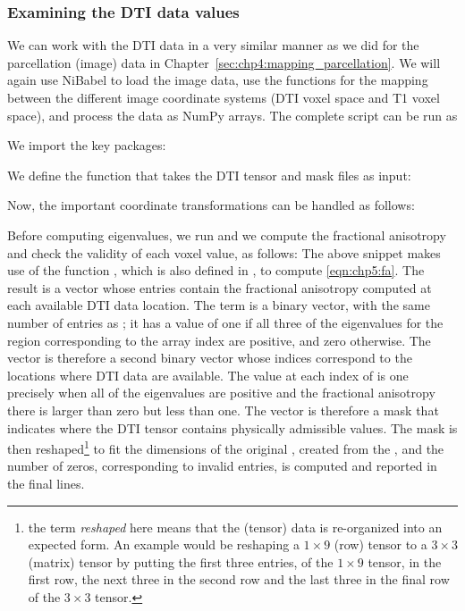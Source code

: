 \subsubsection*{Examining the DTI data values}
We can work with the DTI data in a very similar manner as we did
for the parcellation (image) data in
Chapter~\ref{sec:chp4:mapping_parcellation}. We will again use NiBabel
to load the image data, use the  functions for the mapping
between the different image coordinate systems (DTI voxel space and T1
voxel space), and process the data as NumPy arrays. The complete
script can be run as

We import the key packages:

\noindent We define the function  that takes the DTI
tensor and mask files as input: 

\noindent Now, the important coordinate transformations can be handled as follows:

\noindent Before computing eigenvalues, we run
and we compute the fractional anisotropy and check the validity of each voxel value, as follows:
The above snippet makes use of the function , which is also 
defined in , to compute \eqref{eqn:chp5:fa}.  The result is 
a vector  whose entries contain the fractional anisotropy computed at 
each available DTI data location. The term  is a binary vector, with the 
same number of entries as ; it has a value of one if all three of the eigenvalues 
for the region corresponding to the array index are positive, and zero otherwise. 
The vector  is therefore a second binary vector whose indices correspond 
to the locations where DTI data are available.  The value at each index of  
is one precisely when all of the eigenvalues are positive and the fractional anisotropy 
there is larger than zero but less than one.  The  vector is therefore 
a mask that indicates where the DTI tensor contains physically admissible values.
The  mask is then reshaped\footnote{the term \textit{reshaped} here 
means that the (tensor) data is re-organized into an expected form.  An example 
would be reshaping a $1\times 9$ (row) tensor to a $3\times 3$ (matrix) tensor 
by putting the first three entries, of the $1\times 9$ tensor, in the first 
row, the next three in the second row and the last three in the final row of 
the $3\times 3$ tensor.} 
to fit the dimensions of the original , created from the 
, and the number of zeros, corresponding to invalid entries, is 
computed and reported in the final lines.

